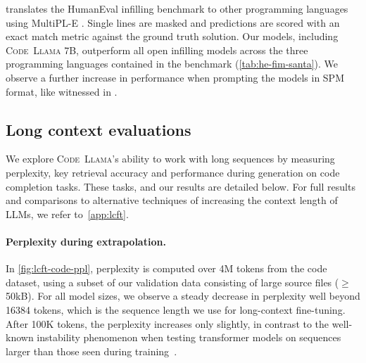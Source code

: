 \citet{allal2023santacoder} translates the HumanEval infilling benchmark to other programming languages using MultiPL-E \citep{cassano2022multiple}. Single lines are masked and predictions are scored with an exact match metric against the ground truth solution. Our models, including \textsc{Code~Llama} 7B, outperform all open infilling models across the three programming languages contained in the benchmark (\ref{tab:he-fim-santa}). We observe a further increase in performance when prompting the models in SPM format, like witnessed in \cite{bavarian2022efficient}. 

\subsection{Long context evaluations}

\label{sec:results-lcft}
We explore \textsc{Code~Llama}'s ability to work with long sequences by measuring perplexity, key retrieval accuracy and performance during generation on code completion tasks. These tasks, and our results are detailed below. For full results and comparisons to alternative techniques of increasing the context length of LLMs, we refer to~\ref{app:lcft}.

\paragraph{Perplexity during extrapolation.} In \ref{fig:lcft-code-ppl}, perplexity is computed over 4M tokens from the code dataset, using a subset of our validation data consisting of large source files ($\ge$50kB).
For all model sizes, we observe a steady decrease in perplexity well beyond 16384 tokens, which is the sequence length we use for long-context fine-tuning. After 100K tokens, the perplexity increases only slightly, in contrast to the well-known instability phenomenon when testing transformer models on sequences larger than those seen during training~\citep{press2021train}.

